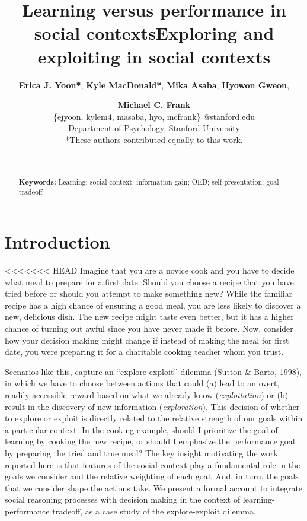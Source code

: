 \documentclass[10pt, letterpaper]{article}
\title{Learning versus performance in social contexts}
\title{Exploring and exploiting in social contexts}
\author{{\large \bf Erica J. Yoon*}, {\large \bf Kyle MacDonald*}, {\large \bf Mika Asaba}, {\large \bf Hyowon Gweon}, \and {\large \bf Michael C. Frank} \\ \{ejyoon, kylem4, masaba, hyo, mcfrank\} @stanford.edu \\ Department of Psychology, Stanford University \\ *These authors contributed equally to this work.}
\begin{document}
\maketitle

\begin{abstract}
\ldots{}

\textbf{Keywords:}
Learning; social context; information gain; OED; self-presentation; goal
tradeoff
\end{abstract}

\section{Introduction}\label{introduction}

<<<<<<< HEAD
Imagine that you are a novice cook and you have to decide what meal to
prepare for a first date. Should you choose a recipe that you have tried
before or should you attempt to make something new? While the familiar
recipe has a high chance of ensuring a good meal, you are less likely to
discover a new, delicious dish. The new recipe might taste even better,
but it has a higher chance of turning out awful since you have never
made it before. Now, consider how your decision making might change if
instead of making the meal for first date, you were preparing it for a
charitable cooking teacher whom you trust.

Scenarios like this, capture an ``explore-exploit'' dilemma (Sutton \&
Barto, 1998), in which we have to choose between actions that could (a)
lead to an overt, readily accessible reward based on what we already
know (\emph{exploitation}) or (b) result in the discovery of new
information (\emph{exploration}). This decision of whether to explore or
exploit is directly related to the relative strength of our goals within
a particular context. In the cooking example, should I prioritize the
goal of learning by cooking the new recipe, or should I emphasize the
performance goal by preparing the tried and true meal? The key insight
motivating the work reported here is that features of the social context
play a fundamental role in the goals we consider and the relative
weighting of each goal. And, in turn, the goals that we consider shape
the actions take. We present a formal account to integrate social
reasoning processes with decision making in the context of
learning-performance tradeoff, as a case study of the explore-exploit
dilemma.
\end{document}
